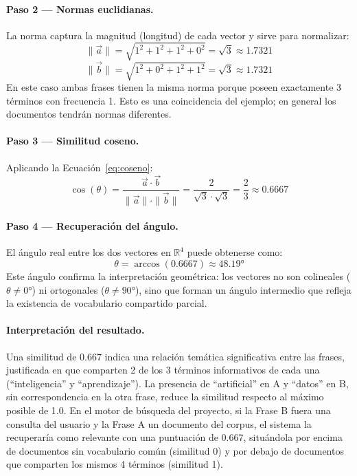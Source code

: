\paragraph{Paso 2 — Normas euclidianas.}
La norma captura la magnitud (longitud) de cada vector y sirve para normalizar:
\[
\|\vec{a}\| = \sqrt{1^2 + 1^2 + 1^2 + 0^2} = \sqrt{3} \approx 1.7321
\]
\[
\|\vec{b}\| = \sqrt{1^2 + 0^2 + 1^2 + 1^2} = \sqrt{3} \approx 1.7321
\]
En este caso ambas frases tienen la misma norma porque poseen exactamente 3 términos con frecuencia 1. Esto es una coincidencia del ejemplo; en general los documentos tendrán normas diferentes.

\paragraph{Paso 3 — Similitud coseno.}
Aplicando la Ecuación~\ref{eq:coseno}:
\[
\cos(\theta) = \frac{\vec{a} \cdot \vec{b}}{\|\vec{a}\| \cdot \|\vec{b}\|} = \frac{2}{\sqrt{3} \cdot \sqrt{3}} = \frac{2}{3} \approx 0.6667
\]

\paragraph{Paso 4 — Recuperación del ángulo.}
El ángulo real entre los dos vectores en $\mathbb{R}^4$ puede obtenerse como:
\[
\theta = \arccos(0.6667) \approx 48.19°
\]
Este ángulo confirma la interpretación geométrica: los vectores no son colineales ($\theta \neq 0°$) ni ortogonales ($\theta \neq 90°$), sino que forman un ángulo intermedio que refleja la existencia de vocabulario compartido parcial.

\paragraph{Interpretación del resultado.}
Una similitud de $0.667$ indica una relación temática significativa entre las frases, justificada en que comparten 2 de los 3 términos informativos de cada una (``inteligencia'' y ``aprendizaje''). La presencia de ``artificial'' en A y ``datos'' en B, sin correspondencia en la otra frase, reduce la similitud respecto al máximo posible de 1.0. En el motor de búsqueda del proyecto, si la Frase B fuera una consulta del usuario y la Frase A un documento del corpus, el sistema la recuperaría como relevante con una puntuación de 0.667, situándola por encima de documentos sin vocabulario común (similitud 0) y por debajo de documentos que comparten los mismos 4 términos (similitud 1).
